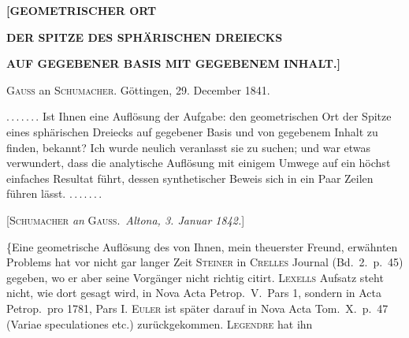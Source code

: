 \clearpage{}
\begin{center}
\textbf{[GEOMETRISCHER ORT}\par\medskip
\textbf{DER SPITZE DES SPHÄRISCHEN DREIECKS}\par\medskip
\textbf{AUF GEGEBENER BASIS MIT GEGEBENEM INHALT.]}
\end{center}

\medskip

\begin{center}
\textsc{Gauss} an \textsc{Schumacher}. Göttingen, 29. December 1841.
\end{center}

\mbox{.\,.\,.\,.\,.\,.\,.} Ist Ihnen eine  Auflösung der Aufgabe: den geometrischen Ort der Spitze eines sphärischen Dreiecks auf gegebener Basis und von gegebenem Inhalt zu finden, bekannt? Ich wurde neulich veranlasst sie zu suchen; und war etwas verwundert, dass die analytische Auflösung mit einigem Umwege auf ein höchst einfaches Resultat führt, dessen synthetischer Beweis sich in ein Paar Zeilen führen lässt. \mbox{.\,.\,.\,.\,.\,.\,.}

\medskip

\begin{center}
[\textsc{Schumacher} \emph{an} \textsc{Gauss}.\ \emph{Altona, 3. Januar 1842.}]
\end{center}

\{Eine geometrische Auflösung des von Ihnen, mein theuerster Freund, erwähnten Problems hat vor nicht gar langer Zeit \textsc{Steiner} in \textsc{Crelles} Journal (Bd.\ 2.\ p.\ 45) gegeben, wo er aber seine Vorgänger nicht richtig citirt. \textsc{Lexells} Aufsatz steht nicht, wie dort gesagt wird, in Nova Acta Petrop.\ V.\ Pars 1, sondern in Acta Petrop.\ pro 1781, Pars I. \textsc{Euler} ist später darauf in Nova Acta Tom.\ X.\ p.\ 47 (Variae speculationes etc.) zurückgekommen. \textsc{Legendre} hat ihn
